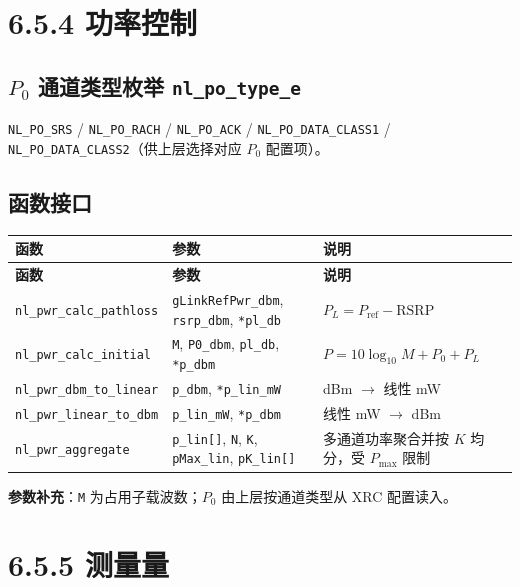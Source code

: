 \documentclass[11pt,a4paper]{ctexart}
\begin{document}
\newpage
\section{6.5.4 功率控制}

\subsection{$P_0$ 通道类型枚举 \texttt{nl\_po\_type\_e}}

\texttt{NL\_PO\_SRS} / \texttt{NL\_PO\_RACH} / \texttt{NL\_PO\_ACK} / \texttt{NL\_PO\_DATA\_CLASS1} / \texttt{NL\_PO\_DATA\_CLASS2}（供上层选择对应 $P_0$ 配置项）。

\subsection{函数接口}

\begin{longtable}{@{}L{4.0cm}L{6.2cm}L{4.3cm}@{}}
\toprule
\textbf{函数} & \textbf{参数} & \textbf{说明} \\
\midrule
\endfirsthead
\toprule\textbf{函数}&\textbf{参数}&\textbf{说明}\\\midrule\endhead
\texttt{nl\_pwr\_calc\_pathloss}
  & \texttt{gLinkRefPwr\_dbm}, \texttt{rsrp\_dbm}, \texttt{*pl\_db}
  & $P_L = P_{\mathrm{ref}} - \mathrm{RSRP}$ \\
\texttt{nl\_pwr\_calc\_initial}
  & \texttt{M}, \texttt{P0\_dbm}, \texttt{pl\_db}, \texttt{*p\_dbm}
  & $P = 10\log_{10} M + P_0 + P_L$ \\
\texttt{nl\_pwr\_dbm\_to\_linear}
  & \texttt{p\_dbm}, \texttt{*p\_lin\_mW}
  & dBm $\rightarrow$ 线性 mW \\
\texttt{nl\_pwr\_linear\_to\_dbm}
  & \texttt{p\_lin\_mW}, \texttt{*p\_dbm}
  & 线性 mW $\rightarrow$ dBm \\
\texttt{nl\_pwr\_aggregate}
  & \texttt{p\_lin[]}, \texttt{N}, \texttt{K}, \texttt{pMax\_lin}, \texttt{pK\_lin[]}
  & 多通道功率聚合并按 $K$ 均分，受 $P_{\max}$ 限制 \\
\bottomrule
\end{longtable}

\textbf{参数补充}：\texttt{M} 为占用子载波数；$P_0$ 由上层按通道类型从 XRC 配置读入。

\newpage
\section{6.5.5 测量量}
\end{document}
